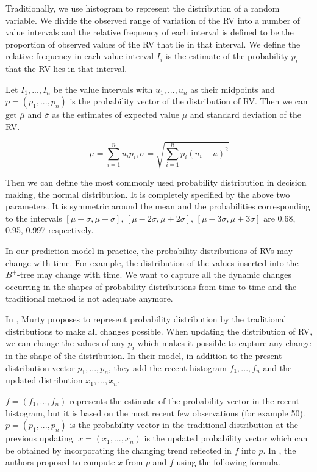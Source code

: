 Traditionally, we use histogram to represent the distribution of a random variable. We divide the observed range
of variation of the RV into a number of value intervals and the relative frequency of each interval is defined
to be the proportion of observed values of the RV that lie in that interval. We define the relative frequency in
each value interval $I_i$ is the estimate of the probability $p_i$ that the RV lies in that interval.

Let $I_1, ..., I_n$ be the value intervals with $u_1, ..., u_n$ as their midpoints and $p=(p_1, ..., p_n)$ is the
probability vector of the distribution of RV. Then we can get $\overline{\mu}$ and $\overline{\sigma}$ as the estimates of
expected value $\mu$ and standard deviation of the RV.

\begin{equation}\label{eq:muandsigma}
    \overline{\mu}=\sum\limits_{i=1}^n u_ip_i , \overline{\sigma}=\sqrt{\sum\limits_{i=1}^n p_i(u_i-u)^2}
\end{equation}

Then we can define the most commonly used probability distribution in decision making, the normal distribution. It is
completely specified by the above two parameters. It is symmetric around the mean and the probabilities corresponding
to the intervals $[\mu-\sigma, \mu+\sigma]$, $[\mu-2\sigma, \mu+2\sigma]$, $[\mu-3\sigma, \mu+3\sigma]$ are 0.68, 0.95, 0.997 respectively.

In our prediction model in practice, the probability distributions of RVs may change with time. For example, the distribution
of the values inserted into the $B^+$-tree may change with time. We want to capture all the dynamic changes occurring
in the shapes of probability distributions from time to time and the traditional method is not adequate anymore.

In \cite{murty2002histogram}, Murty proposes to represent probability distribution by the traditional distributions to make
all changes possible. When updating the distribution of RV, we can change the values of any $p_i$ which makes it
possible to capture any change in the shape of the distribution. In their model, in addition to the present distribution vector
$p_1, ..., p_n$, they add the recent histogram $f_1, ..., f_n$ and the updated distribution $x_1, ..., x_n$.

$f=(f_1, ..., f_n)$ represents the estimate of the probability vector in the recent histogram, but it is based on
the most recent few observations (for example 50). $p=(p_1, ..., p_n)$ is the probability vector in the traditional distribution
at the previous updating. $x=(x_1, ..., x_n)$ is the updated probability vector which can be obtained by incorporating
the changing trend reflected in $f$ into $p$. In \cite{murty2000supply}, the authors proposed to compute $x$ from $p$ and $f$ using
the following formula.


